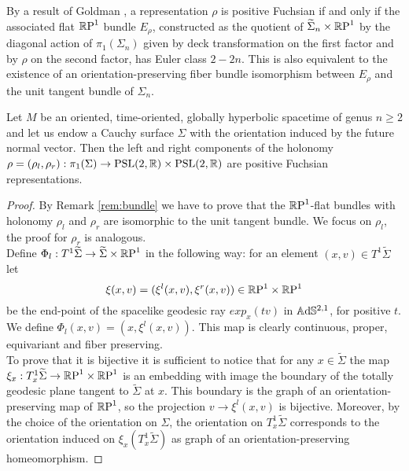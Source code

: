 \begin{observation}\label{rem:bundle}
    By a result of Goldman \cite{goldman1980discontinuous}, a representation $\rho$ is positive Fuchsian if and only if the associated flat $\S$ bundle $E_\rho$, constructed as the quotient of $\widetilde{\Sigma}_n \times \S$ by the diagonal action of $\pi_1(\Sigma_n)$ given by deck transformation on the first factor and by $\rho$ on the second factor, has Euler class $2-2n$. This is also equivalent to the existence of an orientation-preserving fiber bundle isomorphism between $E_\rho$ and the unit tangent bundle of $\Sigma_n$.
\end{observation}
\begin{proposition} \label{prop:hol}
    Let $M$ be an oriented, time-oriented, globally hyperbolic spacetime of genus $n\geq 2$ and let us endow a Cauchy surface $\Sigma$ with the orientation induced by the future normal vector. Then the left and right components of the holonomy $\rho=(\rho_l,\rho_r): \pi_1(\Sigma)\to\PSL\times\PSL$ are positive Fuchsian representations.
\end{proposition}
\begin{proof}
    By Remark \ref{rem:bundle} we have to prove that the $\S$-flat bundles with holonomy $\rho_l$ and $\rho_r$ are isomorphic to the unit tangent bundle. We focus on $\rho_l$, the proof for $\rho_r$ is analogous.\\
    Define $\Phi_l : T^1 \widetilde{\Sigma} \to \widetilde{\Sigma} \times \S$ in the following way: for an element $(x,v) \in T^1 \widetilde{\Sigma}$ let
    \[
        \xi(x,v) = (\xi^l(x,v), \xi^r(x,v)) \in \T
    \]
    be the end-point of the spacelike geodesic ray $exp_x(tv)$ in $\A^{2,1}$, for positive $t$. We define $\Phi_l(x,v)=(x, \xi^l(x,v))$. This map is clearly continuous, proper,
    equivariant and fiber preserving.\\
    To prove that it is bijective it is sufficient to notice that for any $x \in \widetilde{\Sigma}$ the map $\xi_x : T^1_x \widetilde{\Sigma} \to \T$ is an embedding with image the boundary of the totally geodesic plane tangent to $\widetilde{\Sigma}$ at $x$. This boundary is the graph of an orientation-preserving map of $\S$, so the projection $v \to \xi^l(x,v)$ is bijective. Moreover, by the choice of the orientation on $\Sigma$, the orientation on $T^1_x \widetilde{\Sigma}$ corresponds to the orientation induced on $\xi_x (T^1_x \widetilde{\Sigma})$ as graph of an orientation-preserving homeomorphism.
\end{proof}

